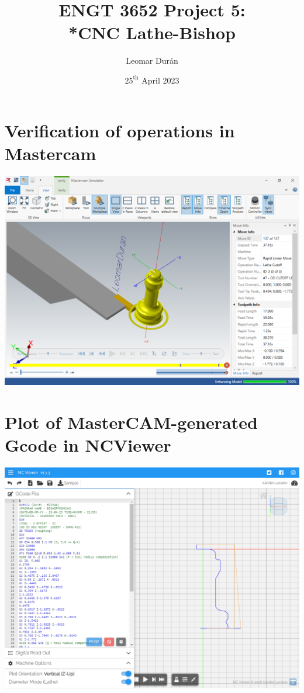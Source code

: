 \documentclass{report}
\title{ENGT 3652 Project 5:\\*CNC Lathe-Bishop}
\author{Leomar Dur\'an}
\date{${25}^{\text{th}}$ April 2023}
\begin{document}
\maketitle

\chapter{Verification of operations in Mastercam}
\begin{landscape}
\vfill
\includegraphics[width=\linewidth]{img/prj05-mastercam_simulator-verification.png}
\vfill
\end{landscape}

\addtocounter{chapter}{1}


\chapter{Plot of MasterCAM-generated Gcode in NCViewer}
\begin{landscape}
\includegraphics[height=\textheight]{img/prj05-cam-gcode-ncviewer-plot-xz.png}
\end{landscape}
\end{document}

